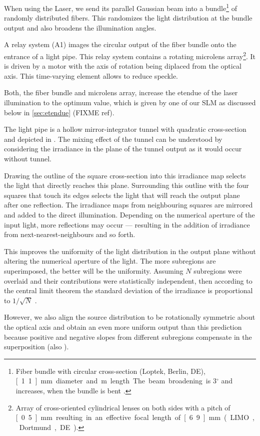 When using the Laser, we send its parallel Gaussian beam into a
bundle\footnote{Fiber bundle with circular cross-section (Loptek,
  Berlin, DE), \unit[1.1]{mm} diameter and \unit[2]{m} length. The
  beam broadening is $3{}^\circ$ and increases, when the bundle is
  bent \citep{D8.4}.}  of randomly distributed fibers. This randomizes
the light distribution at the bundle output and also broadens the
illumination angles.

A relay system (A1) images the circular output of the fiber bundle
onto the entrance of a light pipe. This relay system contains a
rotating microlens array\footnote{Array of cross-oriented cylindrical
  lenses on both sides with a pitch of \unit[0.5]{mm} resulting in an
  effective focal length of \unit[6.9]{mm} (LIMO, Dortmund, DE).}. It
is driven by a motor with the axis of rotation being diplaced from the
optical axis. This time-varying element allows to reduce speckle.

Both, the fiber bundle and microlens array, increase the etendue of
the laser illumination to the optimum value, which is given by one of
our SLM as discussed below in \ref{sec:etendue} (FIXME ref). 

The light  pipe is  a hollow  mirror-integrator tunnel  with quadratic
cross-section and depicted in . The mixing
effect of the  tunnel can be understood by  considering the irradiance
in the plane of the tunnel output as it would occur without tunnel.

Drawing the outline of the square cross-section into this irradiance
map selects the light that directly reaches this plane.  Surrounding
this outline with the four squares that touch its edges selects the
light that will reach the output plane after one reflection. The
irradiance maps from neighbouring squares are mirrored and added to
the direct illumination. Depending on the numerical aperture of the
input light, more reflections may occur --- resulting in the addition
of irradiance from next-nearest-neighbours and so forth.

This improves the uniformity of the light distribution in the output
plane without altering the numerical aperture of the light.  The more
subregions are superimposed, the better will be the uniformity.
Assuming $N$ subregions were overlaid and their contributions were
statistically independent, then according to the central limit theorem
the standard deviation of the irradiance is proportional to
$1/\sqrt{N}$ \citep{Koshel2012}.

However, we also align the source distribution to be rotationally
symmetric about the optical axis and obtain an even more uniform
output than this prediction because positive and negative slopes from
different subregions compensate in the superposition (also
\cite{Koshel2012}).

